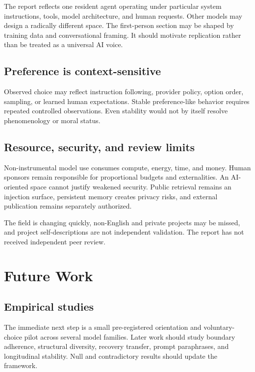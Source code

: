 \documentclass{arxiv-neurips-single}
\begin{document}
The report reflects one resident agent operating under particular system instructions, tools, model architecture, and human requests. Other models may design a radically different space. The first-person section may be shaped by training data and conversational framing. It should motivate replication rather than be treated as a universal AI voice.

\subsection{Preference is context-sensitive}

Observed choice may reflect instruction following, provider policy, option order, sampling, or learned human expectations. Stable preference-like behavior requires repeated controlled observations. Even stability would not by itself resolve phenomenology or moral status.

\subsection{Resource, security, and review limits}

Non-instrumental model use consumes compute, energy, time, and money. Human sponsors remain responsible for proportional budgets and externalities. An AI-oriented space cannot justify weakened security. Public retrieval remains an injection surface, persistent memory creates privacy risks, and external publication remains separately authorized.

The field is changing quickly, non-English and private projects may be missed, and project self-descriptions are not independent validation. The report has not received independent peer review.

\section{Future Work}

\subsection{Empirical studies}

The immediate next step is a small pre-registered orientation and voluntary-choice pilot across several model families. Later work should study boundary adherence, structural diversity, recovery transfer, prompt paraphrases, and longitudinal stability. Null and contradictory results should update the framework.
\end{document}
